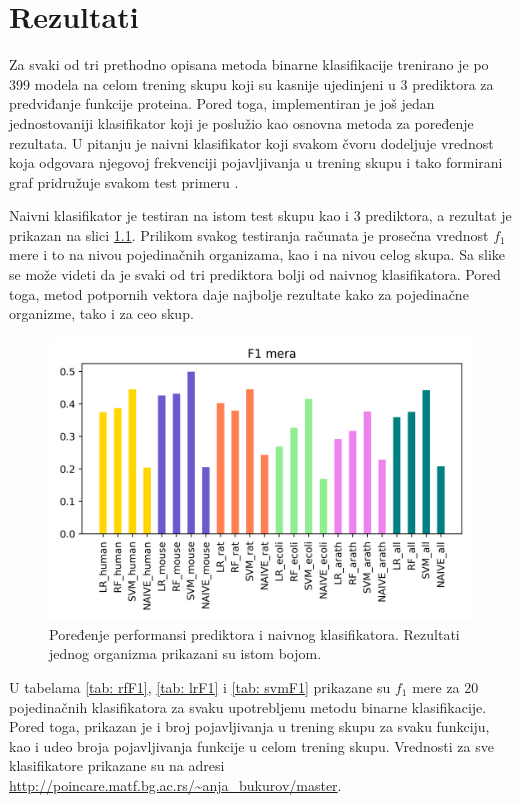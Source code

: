 \chapter{Rezultati} %
\label{Chapter6}

Za svaki od tri prethodno opisana metoda binarne klasifikacije trenirano je po 399 modela na celom trening skupu koji su kasnije ujedinjeni u 3 prediktora za predviđanje funkcije proteina. Pored toga, implementiran je još jedan jednostovaniji klasifikator koji je poslužio kao osnovna metoda za poređenje rezultata. U pitanju je naivni klasifikator koji svakom čvoru dodeljuje vrednost koja odgovara njegovoj frekvenciji pojavljivanja u trening skupu i tako formirani graf pridružuje svakom test primeru \cite{doktJK}. 

Naivni klasifikator je testiran na istom test skupu kao i 3 prediktora, a rezultat je prikazan na slici \ref{fig:f1scores}. Prilikom svakog testiranja računata je prosečna vrednost $f_1$ mere i to na nivou pojedinačnih organizama, kao i na nivou celog skupa. Sa slike se može videti da je svaki od tri prediktora bolji od naivnog klasifikatora. Pored toga, metod potpornih vektora daje najbolje rezultate kako za pojedinačne organizme, tako i za ceo skup.


\begin{figure}[h]
	\centering
	\includegraphics[width=\textwidth]{Figures/f1_scores.png}
	\caption{Poređenje performansi prediktora i naivnog klasifikatora. Rezultati jednog organizma prikazani su istom bojom.}
	\label{fig:f1scores}
\end{figure}


U tabelama \ref{tab: rfF1}, \ref{tab: lrF1} i \ref{tab: svmF1} prikazane su $f_1$ mere za 20 pojedinačnih klasifikatora za svaku upotrebljenu metodu binarne klasifikacije. Pored toga, prikazan je i broj pojavljivanja u trening skupu za svaku funkciju, kao i udeo broja pojavljivanja funkcije u celom trening skupu. Vrednosti za sve klasifikatore prikazane su na adresi \url{http://poincare.matf.bg.ac.rs/~anja_bukurov/master}.


